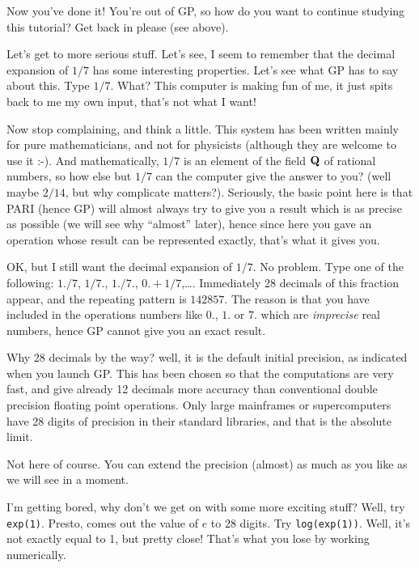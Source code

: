 Now you've done it! You're out of GP, so how do you want to continue studying this
tutorial? Get back in please (see above).

Let's get to more serious stuff. Let's see, I seem to remember that the decimal
expansion of $1/7$ has some interesting properties. Let's see what GP has to say
about this. Type $1/7$. What? This computer is making fun of me, it just spits back
to me my own input, that's not what I want! 

Now stop complaining, and think a little. This system has been written mainly for
pure mathematicians, and not for physicists (although they are welcome to use it :-).
And mathematically, $1/7$ is an element of the field $\Bbb Q$ of rational numbers,
so how else but $1/7$ can the computer give the answer to you? (well maybe $2/14$, but
why complicate matters?). Seriously, the basic point here is that PARI (hence GP)
will almost always try to give you a result which is as precise as possible
(we will see why ``almost'' later), hence since here you gave an operation whose
result can be represented exactly, that's what it gives you.

OK, but I still want the decimal expansion of $1/7$. No problem. Type one of the
following: $1./7$, $1/7.$, $1./7.$, $0.+1/7$,\dots. Immediately 28 decimals of this
fraction appear, and the repeating pattern is $142857$. The reason is that you have
included in the operations numbers like $0.$, $1.$ or $7.$ which are {\sl imprecise\/}
real numbers, hence GP cannot give you an exact result.

Why 28 decimals by the way? well, it is the default initial precision, as indicated
when you launch GP. This has been chosen so that the computations are very fast,
and give already 12 decimals more accuracy than conventional double precision
floating point operations. Only large mainframes or supercomputers have 28 digits
of precision in their standard libraries, and that is the absolute limit.

Not here of course. You can extend the precision (almost) as much as you like as
we will see in a moment.

I'm getting bored, why don't we get on with some more exciting stuff?
Well, try {\tt exp(1)}. Presto, comes out the value of $e$ to 28 digits.
Try {\tt log(exp(1))}. Well, it's not exactly equal to 1, but pretty close!
That's what you lose by working numerically.

